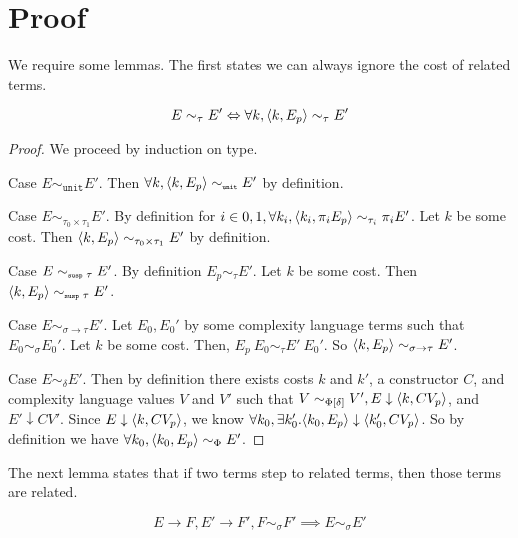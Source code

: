 \section{Proof}

We require some lemmas.  The first states we can always ignore the cost of
related terms.
%
\begin{lemma}
  \label{lem:ignorecost}
\[
  E \sim_\tau E' \Leftrightarrow \forall k, \langle k, E_p \rangle \sim_\tau E'
\]
\end{lemma}
%
\begin{proof}
  We proceed by induction on type.

  Case $E \sim_{\texttt{unit}} E'$.
  Then $\forall k, \langle k, E_p \rangle \sim_{\texttt{\tiny{unit}}} E'$ by definition.

  Case $E \sim_{\tau_0 \times \tau_1} E'$.
  By definition for $i\in{0,1}, \forall k_i, \langle k_i, \pi_i E_p \rangle \sim_{\tau_i} \pi_i E'$.
  Let $k$ be some cost.
  Then $\langle k, E_p \rangle \sim_{\tau_0 \times \tau_1} E'$ by definition.

  Case $E \sim_{\texttt{\tiny{susp }} \tau} E'$.
  By definition $E_p \sim_\tau E'$.
  Let $k$ be some cost.
  Then $\langle k, E_p \rangle \sim_{\texttt{\tiny{susp }} \tau} E'$.

  Case $E \sim_{\sigma \to \tau} E'$.
  Let $E_0, E_0'$ by some complexity language terms such that $E_0 \sim_\sigma E_0'$.
  Let $k$ be some cost.
  Then, $E_p\ E_0 \sim_\tau E'\ E_0'$.
  So $\langle k, E_p \rangle \sim_{\sigma \to \tau} E'$.

  Case $E \sim_\delta E'$.
  Then by definition there exists costs $k$ and $k'$, a constructor $C$, and complexity language values $V$ and $V'$ such that $V \sim_{\Phi[\delta]} V', E \downarrow \langle k, C V_p \rangle$, and $E' \downarrow C V'$.
  Since $E \downarrow \langle k, C V_p \rangle$, we know $\forall k_0, \exists k_0'. \langle k_0, E_p \rangle \downarrow \langle k_0', C V_p \rangle$.
  So by definition we have $\forall k_0, \langle k_0, E_p \rangle \sim_\Phi E'$.
\end{proof}
%
The next lemma states that if two terms step to related terms, then those terms
are related.
%
\begin{lemma}
  \label{lem:relatedstepback}
  \[
    E \to F, E' \to F', F \sim_\sigma F' \implies E \sim_\sigma E'
  \]
\end{lemma}
%
